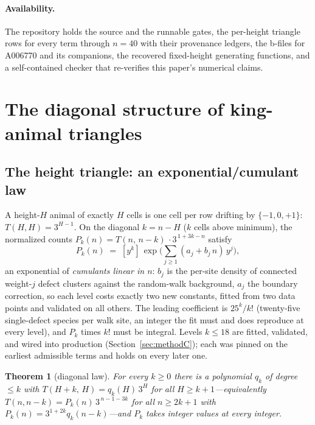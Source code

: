 \documentclass[11pt]{article}
\newtheorem{theorem}{Theorem}
\begin{document}
\paragraph{Availability.} The repository holds the source and the runnable
gates, the per-height triangle rows for every term through $n=40$ with their
provenance ledgers, the b-files for A006770 and its companions, the recovered
fixed-height generating functions, and a self-contained checker that
re-verifies this paper's numerical claims.

\section{The diagonal structure of king-animal triangles}
\label{sec:diagonals}

\subsection{The height triangle: an exponential/cumulant law}
\label{sec:heightdiag}

A height-$H$ animal of exactly $H$ cells is one cell per row drifting by
$\{-1,0,+1\}$: $T(H,H)=3^{H-1}$. On the diagonal $k=n-H$ ($k$ cells above
minimum), the normalized counts
$P_k(n) = T(n,\,n-k)\,\cdot 3^{\,1+3k-n}$
satisfy
\[
  P_k(n) \;=\; [y^k]\,\exp\!\Big(\sum_{j\ge1}(a_j+b_j\,n)\,y^j\Big),
\]
an exponential of \emph{cumulants linear in $n$}: $b_j$ is the per-site
density of connected weight-$j$ defect clusters against the random-walk
background, $a_j$ the boundary correction, so each level costs exactly two
new constants, fitted from two data points and validated on all others. The
leading coefficient is $25^k/k!$ (twenty-five single-defect species per walk
site, an integer the fit must and does reproduce at every level), and $P_k$
times $k!$ must be integral. Levels $k\le18$ are fitted, validated, and wired
into production (Section~\ref{sec:methodC}); each was pinned on the earliest
admissible terms and holds on every later one.

\begin{theorem}[diagonal law]
\label{thm:diaglaw}
For every $k\ge0$ there is a polynomial $q_k$ of degree $\le k$ with
$T(H{+}k,\,H)=q_k(H)\,3^H$ for \emph{all} $H\ge k+1$---equivalently
$T(n,n{-}k)=P_k(n)\,3^{\,n-1-3k}$ for all $n\ge 2k+1$ with
$P_k(n)=3^{1+2k}q_k(n{-}k)$---and $P_k$ takes integer values at every
integer.
\end{theorem}
\end{document}
